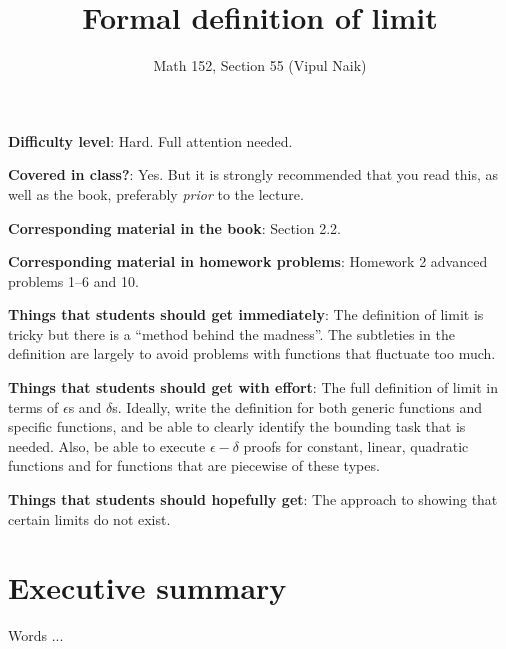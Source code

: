 \documentclass[10pt]{amsart}
\title{Formal definition of limit}
\author{Math 152, Section 55 (Vipul Naik)}
\begin{document}
\maketitle

{\bf Difficulty level}: Hard. Full attention needed.

{\bf Covered in class?}: Yes. But it is strongly recommended that you
read this, as well as the book, preferably {\em prior} to the lecture.

{\bf Corresponding material in the book}: Section 2.2.

{\bf Corresponding material in homework problems}: Homework 2 advanced
problems 1--6 and 10.

{\bf Things that students should get immediately}: The definition of
limit is tricky but there is a ``method behind the madness''. The
subtleties in the definition are largely to avoid problems with
functions that fluctuate too much.

{\bf Things that students should get with effort}: The full definition
of limit in terms of $\epsilon$s and $\delta$s. Ideally, write the
definition for both generic functions and specific functions, and be
able to clearly identify the bounding task that is needed. Also, be
able to execute $\epsilon-\delta$ proofs for constant, linear,
quadratic functions and for functions that are piecewise of these
types.

{\bf Things that students should hopefully get}: The approach to
showing that certain limits do not exist.

\section*{Executive summary}

Words ...
\end{document}

